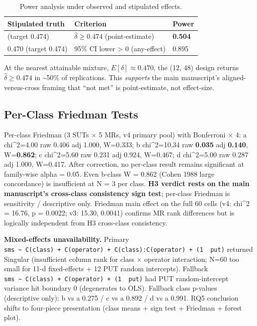 \documentclass[manuscript,screen,review]{acmart}
\begin{document}
{%
\begin{longtable}[]{@{}lll@{}}
\caption{Power analysis under observed and stipulated effects.}\label{tab:p2-24}\\
\toprule\noalign{}
Stipulated truth & Criterion & Power \\
\midrule\noalign{}
\endfirsthead
\endhead
\bottomrule\noalign{}
\endlastfoot
0.470 (target 0.474) & $\hat{\delta} \geq 0.474$ (point-estimate) & \textbf{0.504} \\
0.470 (target 0.474) & 95\% CI lower \textgreater{} 0 (any-effect) & 0.895 \\
\end{longtable}
}

At the nearest attainable mixture, \(E[\delta]\approx0.470\), the
(12, 48) design returns $\hat{\delta} \geq
0.474$ in \textasciitilde50\% of replications. This
\emph{supports} the main manuscript's aligned-versus-cross framing that ``not met'' is point-estimate, not
effect-size.

\subsection{Per-Class Friedman Tests}\label{d.4-friedman-per-class-discussion-of-small-n-concordance}

Per-class Friedman (3 SUTs $\times$ 5 MRs, v4 primary pool) with Bonferroni
$\times$ 4: a chi\^{}2=4.00
raw 0.406 adj 1.000, W=0.333; b chi\^{}2=10.34 raw \textbf{0.035} adj
\textbf{0.140}, W=\textbf{0.862}; c chi\^{}2=5.60 raw 0.231 adj 0.924,
W=0.467; d chi\^{}2=5.00 raw 0.287 adj 1.000, W=0.417. After correction,
no per-class result remains significant at family-wise alpha = 0.05.
Even b-class W = 0.862 (Cohen 1988 large concordance) is insufficient at
N = 3 per class. \textbf{H3 verdict rests on the main manuscript's cross-class consistency sign test}; per-class
Friedman is sensitivity / descriptive only. Friedman main effect on the full
60 cells (v4: chi\^{}2 = 16.76, p = 0.0022; v3: 15.30, 0.0041) confirms
MR rank differences but
is logically independent from H3 cross-class consistency.

\textbf{Mixed-effects unavailability.} Primary
\texttt{sms\ \textasciitilde{}\ C(class)\ +\ C(operator)\ +\ C(class):C(operator)\ +\ (1\ \textbar{}\ put)}
returned Singular (insufficient column rank for class $\times$ operator
interaction; N=60 too small for 11-d fixed-effects + 12 PUT random
intercepts). Fallback
\texttt{sms\ \textasciitilde{}\ C(class)\ +\ C(operator)\ +\ (1\ \textbar{}\ put)}
had PUT random-intercept variance hit boundary 0 (degenerates to OLS).
Fallback class p-values (descriptive only): b vs a 0.275 / c vs a 0.892
/ d vs a 0.991. RQ5 conclusion shifts to four-piece presentation (class
means + sign test + Friedman + forest plot).
\end{document}
